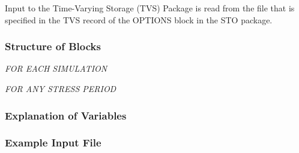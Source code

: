 Input to the Time-Varying Storage (TVS) Package is read from the file that is specified in the TVS record of the OPTIONS block in the STO package.

\vspace{5mm}
\subsubsection{Structure of Blocks}
\vspace{5mm}

\noindent \textit{FOR EACH SIMULATION}

\vspace{5mm}
\noindent \textit{FOR ANY STRESS PERIOD}


\vspace{5mm}
\subsubsection{Explanation of Variables}
\begin{description}

\end{description}

\vspace{5mm}
\subsubsection{Example Input File}


